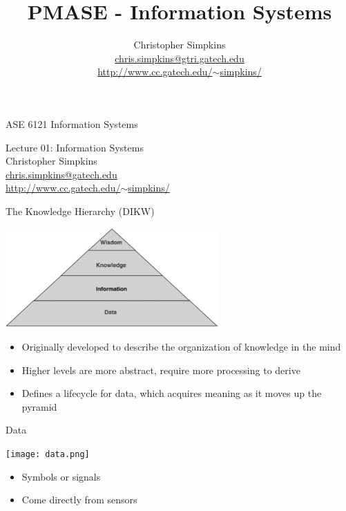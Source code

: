 \documentclass{beamer}
\title[Information Systems] %
{PMASE - Information Systems}
\author[Chris Simpkins] %
{Christopher Simpkins\\\href{mailto:chris.simpkins@gtri.gatech.edu}{chris.simpkins@gtri.gatech.edu}\\\href{http://www.cc.gatech.edu/~simpkins/}{http://www.cc.gatech.edu/$\sim$simpkins/}}
\institute[GTRI] %
\date[] %
{}
\begin{document}
\begin{frame}{ASE 6121 Information Systems}

\begin{center}
{\LARGE Lecture 01: Information Systems}\\
\vspace{.2in}
{\Large Christopher Simpkins}\\
{\large \href{mailto:chris.simpkins@gatech.edu}{chris.simpkins@gatech.edu}}\\
{\large \href{http://www.cc.gatech.edu/~simpkins/}{http://www.cc.gatech.edu/$\sim$simpkins/}}
\end{center}

\end{frame}

\begin{frame}{The Knowledge Hierarchy (DIKW)}

\begin{center}
\includegraphics[height=1.5in]{knowledge-pyramid.png}
\end{center}

\begin{itemize}
\item Originally developed to describe the organization of knowledge
  in the mind
\item Higher levels are more abstract, require more processing to
  derive
\item Defines a lifecycle for data, which acquires meaning as it moves
  up the pyramid
\end{itemize}

\end{frame}

\begin{frame}{Data}

\begin{center}
\texttt{[image: data.png]}
\end{center}

\begin{itemize}
\item Symbols or signals
\item Come directly from sensors
\end{itemize}

\end{frame}
\end{document}
